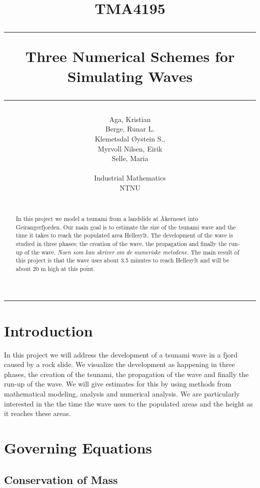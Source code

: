 \documentclass[11pt]{article}
\author{Aga, Kristian \\ Berge, Runar L. \\ Klemetsdal Øystein S.,\\
	Myrvoll Nilsen, Eirik \\ Selle, Maria\\\\
	Industrial Mathematics\\
	NTNU \\\\
}
\title{
TMA4195 \\ \vspace{5pt}
\hrule \vspace{10pt}
       {\Huge \textbf{Three Numerical Schemes for Simulating Waves}}
\vspace{10pt}\hrule\vspace{1cm}
}
\begin{document}
\maketitle
\vspace{1cm}
\hrule
\vspace{0.5cm}
\begin{abstract}
	In this project we model a tsunami from a landslide at Åkerneset into Geirangerfjorden. Our main goal is to estimate the size of the tsunami
	wave and the time it takes to reach the populated area Hellesylt. The development of the wave is studied in three phases; the creation of the wave,
	the propagation and finally the run-up of the wave. \emph{Noen som kan skriver om de numeriske metodene.}
	The main result of this project is that the wave uses about 3.5 minutes to reach Hellesylt and will be about 20 m high at this point. 
\end{abstract}
\thispagestyle{empty}
\clearpage
\tableofcontents
\thispagestyle{empty}
\clearpage
\setcounter{page}{1}
%
%
\section{Introduction}
In this project we will address the development of a tsunami wave in a fjord caused by a rock slide. We visualize the development as happening in three phases,
the creation of the tsunami, the propagation of the wave and finally the run-up of the wave. We will give estimates for this by using methods from mathematical modeling,
analysis and numerical analysis. We are particularly interested in the the time the wave uses to the populated areas and the height as it reaches these areas.

\section{Governing Equations}

\subsection{Conservation of Mass}
\end{document}
